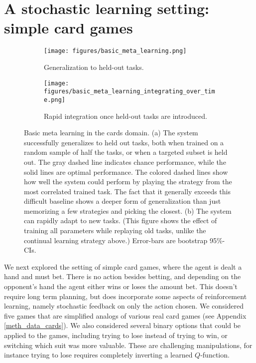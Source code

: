 \documentclass{article}
\begin{document}
\section{A stochastic learning setting: simple card games}
\begin{figure}
\centering
\begin{subfigure}[t]{0.5\textwidth}
\texttt{[image: figures/basic\_meta\_learning.png]}
\caption{Generalization to held-out tasks.}
\label{cards_basic_results}
\end{subfigure}%
\begin{subfigure}[t]{0.5\textwidth}
\texttt{[image: figures/basic\_meta\_learning\_integrating\_over\_time.png]}
\caption{Rapid integration once held-out tasks are introduced.}
\label{cards_basic_integration_results}
\end{subfigure}
\caption{Basic meta learning in the cards domain. (a) The system successfully generalizes to held out tasks, both when trained on a random sample of half the tasks, or when a targeted subset is held out. The gray dashed line indicates chance performance, while the solid lines are optimal performance. The colored dashed lines show how well the system could perform by playing the strategy from the most correlated trained task. The fact that it generally exceeds this difficult baseline shows a deeper form of generalization than just memorizing a few strategies and picking the closest. (b) The system can rapidly adapt to new tasks. (This figure shows the effect of training all parameters while replaying old tasks, unlike the continual learning strategy above.) Error-bars are bootstrap 95\%-CIs.}
\end{figure}
We next explored the setting of simple card games, where the agent is dealt a hand and must bet. There is no action besides betting, and depending on the opponent's hand the agent either wins or loses the amount bet. This doesn't require long term planning, but does incorporate some aspects of reinforcement learning, namely stochastic feedback on only the action chosen. We considered five games that are simplified analogs of various real card games (see Appendix \ref{meth_data_cards}). We also considered several binary options that could be applied to the games, including trying to lose instead of trying to win, or switching which suit was more valuable. These are challenging manipulations, for instance trying to lose requires completely inverting a learned $Q$-function. \par
\end{document}
